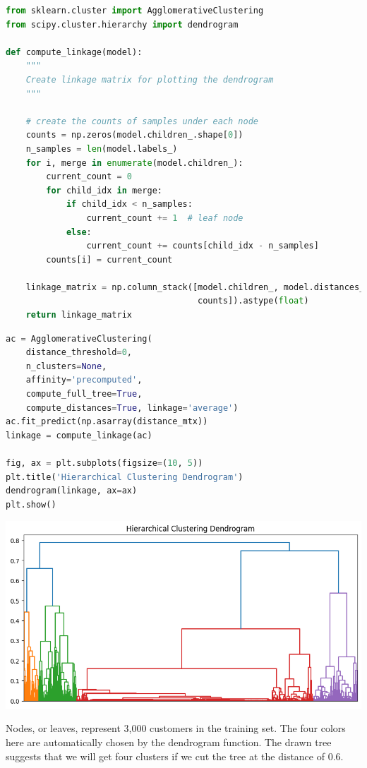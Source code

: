 \documentclass{article}
\begin{document}
\begin{lstlisting}[language=Python]
from sklearn.cluster import AgglomerativeClustering
from scipy.cluster.hierarchy import dendrogram

def compute_linkage(model):
    """
    Create linkage matrix for plotting the dendrogram
    """

    # create the counts of samples under each node
    counts = np.zeros(model.children_.shape[0])
    n_samples = len(model.labels_)
    for i, merge in enumerate(model.children_):
        current_count = 0
        for child_idx in merge:
            if child_idx < n_samples:
                current_count += 1  # leaf node
            else:
                current_count += counts[child_idx - n_samples]
        counts[i] = current_count

    linkage_matrix = np.column_stack([model.children_, model.distances_,
                                      counts]).astype(float)
    return linkage_matrix
\end{lstlisting}

\begin{lstlisting}[language=Python]
ac = AgglomerativeClustering(
    distance_threshold=0, 
    n_clusters=None, 
    affinity='precomputed', 
    compute_full_tree=True, 
    compute_distances=True, linkage='average')
ac.fit_predict(np.asarray(distance_mtx))
linkage = compute_linkage(ac)

fig, ax = plt.subplots(figsize=(10, 5)) 
plt.title('Hierarchical Clustering Dendrogram')
dendrogram(linkage, ax=ax)
plt.show()
\end{lstlisting}

\includegraphics[width=1\textwidth]{dendrogram_depth3}

Nodes, or leaves, represent 3,000 customers in the training set. The four colors here are automatically chosen by the dendrogram function. The drawn tree suggests that we will get four clusters if we cut the tree at the distance of 0.6.
\end{document}
